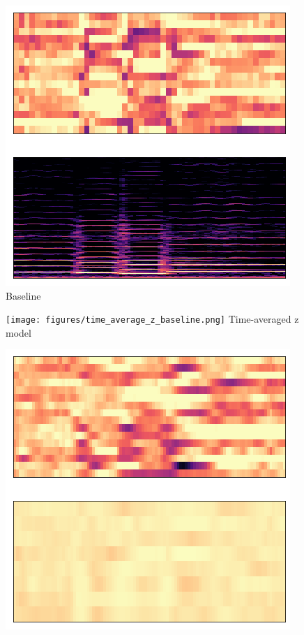\begin{figure}
    \centering
    \begin{minipage}[b]{0.3\textwidth}
        \includegraphics[width=\textwidth]{figures/time_distributed_z_baseline.png}
        \small Baseline
    \end{minipage}
    \hfill
    \begin{minipage}[b]{0.3\textwidth}
        \texttt{[image: figures/time\_average\_z\_baseline.png]}
        \small Time-averaged z model
    \end{minipage}
    \hfill
    \begin{minipage}[b]{0.3\textwidth}
        \includegraphics[width=\textwidth]{figures/time_groupwise_z_improved.png}

\end{minipage}
\end{figure}
